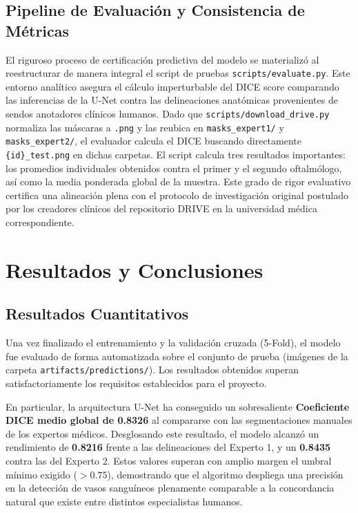 \documentclass[conference]{IEEEtran}
\begin{document}
\subsection{Pipeline de Evaluación y Consistencia de Métricas}
El riguroso proceso de certificación predictiva del modelo se materializó al reestructurar de manera integral el script de pruebas \texttt{scripts/evaluate.py}. Este entorno analítico asegura el cálculo imperturbable del DICE score comparando las inferencias de la U-Net contra las delineaciones anatómicas provenientes de sendos anotadores clínicos humanos. Dado que \texttt{scripts/download\_drive.py} normaliza las máscaras a \texttt{.png} y las reubica en \texttt{masks\_expert1/} y \texttt{masks\_expert2/}, el evaluador calcula el DICE buscando directamente \texttt{\{id\}\_test.png} en dichas carpetas. El script calcula tres resultados importantes: los promedios individuales obtenidos contra el primer y el segundo oftalmólogo, así como la media ponderada global de la muestra. Este grado de rigor evaluativo certifica una alineación plena con el protocolo de investigación original postulado por los creadores clínicos del repositorio DRIVE en la universidad médica correspondiente.

\section{Resultados y Conclusiones}

\subsection{Resultados Cuantitativos}
Una vez finalizado el entrenamiento y la validación cruzada (5-Fold), el modelo fue evaluado de forma automatizada sobre el conjunto de prueba (imágenes de la carpeta \texttt{artifacts/predictions/}). Los resultados obtenidos superan satisfactoriamente los requisitos establecidos para el proyecto.

En particular, la arquitectura U-Net ha conseguido un sobresaliente \textbf{Coeficiente DICE medio global de 0.8326} al compararse con las segmentaciones manuales de los expertos médicos. Desglosando este resultado, el modelo alcanzó un rendimiento de \textbf{0.8216} frente a las delineaciones del Experto 1, y un \textbf{0.8435} contra las del Experto 2. Estos valores superan con amplio margen el umbral mínimo exigido ($>0.75$), demostrando que el algoritmo despliega una precisión en la detección de vasos sanguíneos plenamente comparable a la concordancia natural que existe entre distintos especialistas humanos.
\end{document}
